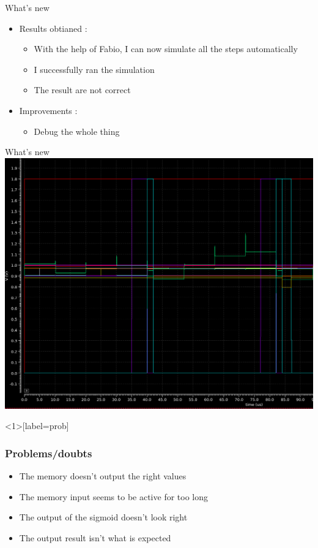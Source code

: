 \documentclass[table]{beamer}
\begin{document}
\begin{frame}{What's new}
  \begin{itemize}
    \item Results obtianed :
      \begin{itemize}
          \color{text}
        \item With the help of Fabio, I can now simulate all the steps automatically
        \item I successfully ran the simulation
        \item The result are not correct
      \end{itemize}
    \item Improvements :
      \begin{itemize}
          \color{text}
        \item Debug the whole thing
      \end{itemize}
  \end{itemize}
\end{frame}

\begin{frame}{What's new}
  \includegraphics[width=\textwidth]{fulltrial1/fulltrial1-all-curves}
\end{frame}

\begin{frame}<1>[label=prob]
  \frametitle{Problems/doubts}
  \begin{itemize}
    \item<1-> The memory doesn't output the right values
    \item<2-> The memory input seems to be active for too long
    \item<3-> The output of the sigmoid doesn't look right
    \item<4-> The output result isn't what is expected
  \end{itemize}
\end{frame}
\end{document}

